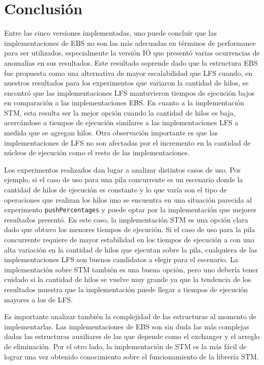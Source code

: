 \chapter{Conclusión}

Entre las cinco versiones implementadas, uno puede concluir que las implementaciones de EBS no son las más adecuadas en términos de performance para ser utilizados, especialmente la versión IO que presentó varias ocurrencias de anomalías en sus resultados. Este resultado soprende dado que la estructura EBS fue propuesta como una alternativa de mayor escalabilidad que LFS cuando, en nuestros resultados para los experimentos que variaron la cantidad de hilos, se encontró que las implementaciones LFS mantuvieron tiempos de ejecución bajos en comparación a las implementaciones EBS. En cuanto a la implementación STM, esta resulta ser la mejor opción cuando la cantidad de hilos es baja, acercándose a tiempos de ejecución similares a las implementaciones LFS a medida que se agregan hilos. Otra observación importante es que las implementaciones de LFS no son afectadas por el incremento en la cantidad de núcleos de ejecución como el resto de las implementaciones.

Los experimentos realizados dan lugar a analizar distintos casos de uso. Por ejemplo, si el caso de uso para una pila concurrente es un escenario donde la cantidad de hilos de ejecución es constante y lo que varía son el tipo de operaciones que realizan los hilos uno se encuentra en una situación parecida al experimento \texttt{pushPercentages} y puede optar por la implementación que mejores resultados presentó. En este caso, la implementación STM es una opción clara dado que obtuvo los menores tiempos de ejecución. Si el caso de uso para la pila concurrente requiere de mayor estabilidad en los tiempos de ejecución a con una alta variación en la cantidad de hilos que ejecutan sobre la pila, cualquiera de las implementaciones LFS son buenos candidatos a elegir para el escenario. La implementación sobre STM también es una buena opción, pero uno debería tener cuidado si la cantidad de hilos se vuelve muy grande ya que la tendencia de los resultados muestra que la implementación puede llegar a tiempos de ejecución mayores a los de LFS.

Es importante analizar también la complejidad de las estructuras al momento de implementarlas. Las implementaciones de EBS son sin duda las más complejas dadas las estructuras auxiliares de las que depende como el exchanger y el arreglo de eliminación. Por el otro lado, la implementación de STM es la más fácil de lograr una vez obtenido conocimiento sobre el funcionamiento de la librería STM.

